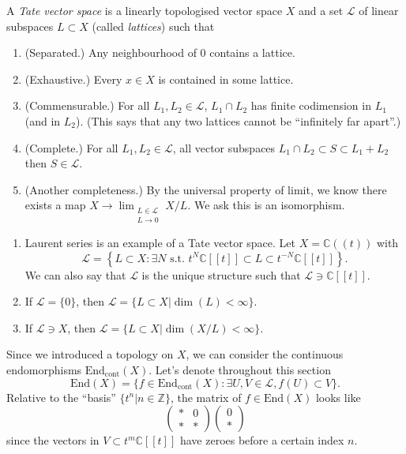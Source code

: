 \begin{definition}
\label{definition-tate}
A {\it Tate vector space} is a linearly
topologised vector space $X$ and a set $\mathcal{L}$ 
of linear subspaces $L \subset X$ 
(called {\it lattices}) such that
\begin{enumerate}
\item (Separated.) Any neighbourhood of $0$ contains
a lattice.

\item (Exhaustive.) Every $x \in X$
is contained in some lattice.

\item (Commensurable.) For all $L_1,L_2 \in \mathcal{L}$,
$L_1 \cap L_2$ has finite codimension
in $L_1$ (and in $L_2$). (This says
that any two lattices cannot be
``infinitely far apart''.)

\item (Complete.) For all $L_1,L_2 \in \mathcal{L}$,
all vector subspaces 
$L_1 \cap L_2 \subset S \subset L_1+L_2$
then $S \in \mathcal{L}$.

\item (Another completeness.) By the universal property of limit,
we know there exists a map
$X \to \lim_{\substack{L \in \mathcal{L} \\ L \to 0}} X/L$.
We ask this is an isomorphism.
\end{enumerate}
\end{definition}

\begin{example}
\label{example-tate-vector-space}
\begin{enumerate}
\item 
Laurent series is an example of a Tate vector space.
Let $X=\mathbb{C}(\!(t)\!)$ with
 $$
\mathcal{L}=\left\{L\subset X:\exists N\text{ s.t. }
t^N \mathbb{C}[\![t]\!] \subset L \subset
t^{-N}\mathbb{C}[\![t]\!]\right\}.
$$
We can also say that $\mathcal{L}$ is the
unique structure such that $\mathcal{L} \ni \mathbb{C}[\![t]\!]$.

\item If $\mathcal{L}=\{0\}$,
then $\mathcal{L}=\{L \subset X | \dim(L)<\infty\}$.

\item If $\mathcal{L}\ni X$, then
$\mathcal{L}=\{L \subset X|\dim(X/L)<\infty\}$.
\end{enumerate}
\end{example}

\noindent
Since we introduced a topology on $X$,
we can consider the continuous endomorphisms
$\text{End}_{\text{cont}}(X)$.
Let's denote throughout this section
 $$
\text{End}(X)=\{f \in \text{End}_{\text{cont}}(X)
:\exists U,V \in \mathcal{L}, f(U)\subset V\}.
$$
Relative to the ``basis''
$\{t^n|n \in \mathbb{Z}\}$,
the matrix of $f \in \text{End}(X)$ 
looks like
$$
\begin{pmatrix}
*&0\\ 
*&*
\end{pmatrix}
\begin{pmatrix}
0\\
*
\end{pmatrix}
$$
since the vectors in $V\subset t^m\mathbb{C}[\![t]\!]$
have zeroes before a certain index $n$.

